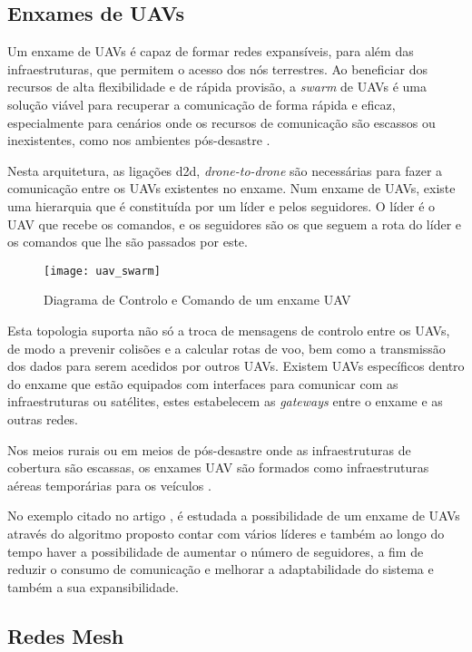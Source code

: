 \subsection{Enxames de UAVs}

Um enxame de UAVs é capaz de formar redes expansíveis, para além das infraestruturas, que permitem o acesso dos nós terrestres. Ao beneficiar dos recursos de alta flexibilidade e de rápida provisão, a \textit{swarm} de UAVs é uma solução viável para recuperar a comunicação de forma rápida e eficaz, especialmente para cenários onde os recursos de comunicação são escassos ou inexistentes, como nos ambientes pós-desastre \cite{Shi2018}. 

Nesta arquitetura, as ligações d2d, \textit{drone-to-drone} são necessárias para fazer a comunicação entre os UAVs existentes no enxame. Num enxame de UAVs, existe uma hierarquia que é constituída por um líder e pelos seguidores. O líder é o UAV que recebe os comandos, e os seguidores são os que seguem a rota do líder e os comandos que lhe são passados por este.

\begin{figure}[H]
\centering
\texttt{[image: uav\_swarm]}
\caption{Diagrama de Controlo e Comando de um enxame UAV\label{fig:uav_swarm} }\cite{G.Madey2013}
\end{figure}

Esta topologia suporta não só a troca de mensagens de controlo entre os UAVs, de modo a prevenir colisões e a calcular rotas de voo,  bem como a transmissão dos dados para serem acedidos por outros UAVs. Existem UAVs específicos dentro do enxame que estão equipados com interfaces para comunicar com as infraestruturas ou satélites, estes estabelecem as \textit{gateways} entre o enxame e as outras redes.

Nos meios rurais ou em meios de pós-desastre onde as infraestruturas de cobertura são escassas, os enxames UAV são formados como infraestruturas aéreas temporárias para os veículos \cite{Shi2018}.

No exemplo citado no artigo \cite{He2018}, é estudada a possibilidade de um enxame de UAVs através do algoritmo proposto contar com vários líderes e também ao longo do tempo haver a possibilidade de aumentar o número de seguidores, a fim de reduzir o consumo de comunicação e melhorar a adaptabilidade do sistema e também a sua expansibilidade.

\subsection{Redes Mesh}

